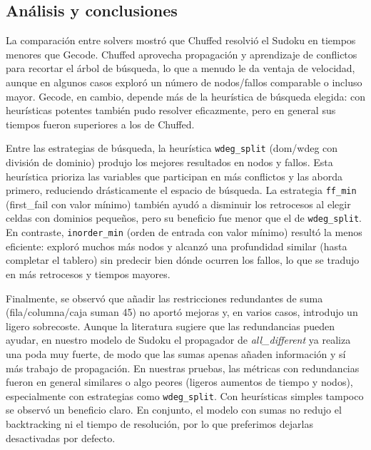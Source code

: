
\subsection{Análisis y conclusiones}\label{sec:01-sudoku-analisis-y-conclusiones}
La comparación entre solvers mostró que Chuffed resolvió el Sudoku en tiempos menores que Gecode. Chuffed aprovecha propagación y aprendizaje de conflictos para recortar el árbol de búsqueda, lo que a menudo le da ventaja de velocidad, aunque en algunos casos exploró un número de nodos/fallos comparable o incluso mayor. Gecode, en cambio, depende más de la heurística de búsqueda elegida: con heurísticas potentes también pudo resolver eficazmente, pero en general sus tiempos fueron superiores a los de Chuffed.

Entre las estrategias de búsqueda, la heurística \texttt{wdeg\_split} (dom/wdeg con división de dominio) produjo los mejores resultados en nodos y fallos. Esta heurística prioriza las variables que participan en más conflictos y las aborda primero, reduciendo drásticamente el espacio de búsqueda. La estrategia \texttt{ff\_min} (first\_fail con valor mínimo) también ayudó a disminuir los retrocesos al elegir celdas con dominios pequeños, pero su beneficio fue menor que el de \texttt{wdeg\_split}. En contraste, \texttt{inorder\_min} (orden de entrada con valor mínimo) resultó la menos eficiente: exploró muchos más nodos y alcanzó una profundidad similar (hasta completar el tablero) sin predecir bien dónde ocurren los fallos, lo que se tradujo en más retrocesos y tiempos mayores.

Finalmente, se observó que añadir las restricciones redundantes de suma (fila/columna/caja suman 45) no aportó mejoras y, en varios casos, introdujo un ligero sobrecoste. Aunque la literatura sugiere que las redundancias pueden ayudar, en nuestro modelo de Sudoku el propagador de \textit{all\_different} ya realiza una poda muy fuerte, de modo que las sumas apenas añaden información y sí más trabajo de propagación. En nuestras pruebas, las métricas con redundancias fueron en general similares o algo peores (ligeros aumentos de tiempo y nodos), especialmente con estrategias como \texttt{wdeg\_split}. Con heurísticas simples tampoco se observó un beneficio claro. En conjunto, el modelo con sumas no redujo el backtracking ni el tiempo de resolución, por lo que preferimos dejarlas desactivadas por defecto.

